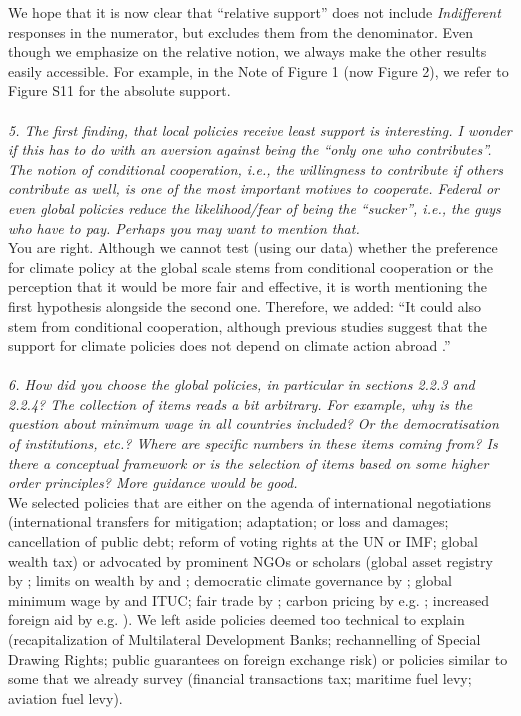 \documentclass[12pt,english]{article}
\begin{document}
We hope that it is now clear that ``relative support'' does not include \textit{Indifferent} responses in the numerator, but excludes them from the denominator. Even though we emphasize on the relative notion, we always make the other results easily accessible. For example, in the Note of Figure 1 (now Figure 2), we refer to Figure S11 for the absolute support. %
~\\ ~\\

\textit{5. The first finding, that local policies receive least support is interesting. I wonder if this has to do with an aversion against being the “only one who contributes”. The notion of conditional cooperation, i.e., the willingness to contribute if others contribute as well, is one of the most important motives to cooperate. Federal or even global policies reduce the likelihood/fear of being the “sucker”, i.e., the guys who have to pay. Perhaps you may want to mention that.}~\\

You are right. Although we cannot test (using our data) whether the preference for climate policy at the global scale stems from conditional cooperation or the perception that it would be more fair and effective, it is worth mentioning the first hypothesis alongside the second one. Therefore, we added: ``It could also stem from conditional cooperation, although previous studies suggest that the support for climate policies does not depend on climate action abroad \citep{aklin_prisoners_2020,tingley_conditional_2014}.''
~\\ ~\\

\textit{6. How did you choose the global policies, in particular in sections 2.2.3 and 2.2.4? The collection of items reads a bit arbitrary. For example, why is the question about minimum wage in all countries included? Or the democratisation of institutions, etc.? Where are specific numbers in these items coming from? Is there a conceptual framework or is the selection of items based on some higher order principles? More guidance would be good.}~\\


We selected policies that are either on the agenda of international negotiations (international transfers for mitigation; adaptation; or loss and damages; cancellation of public debt; reform of voting rights at the UN or IMF; global wealth tax) or advocated by prominent NGOs or scholars (global asset registry by \citet{icrict_roadmap_2020}; limits on wealth by \citet{robeyns_limitarianism_2024} and \citet{piketty_brief_2022}; democratic climate governance by \citet{dryzek_global_2011}; global minimum wage by \citet{palley_financial_2013} and ITUC; %
fair trade by \citet{hickel_divide_2017}; carbon pricing by e.g. \citet{cramton_global_2017}; increased foreign aid by e.g. \citet{concord_aid_2019}). 
We left aside policies deemed too technical to explain (recapitalization of Multilateral Development Banks; rechannelling of Special Drawing Rights; public guarantees on foreign exchange risk) or policies similar to some that we already survey (financial transactions tax; maritime fuel levy; aviation fuel levy). 
\end{document}
